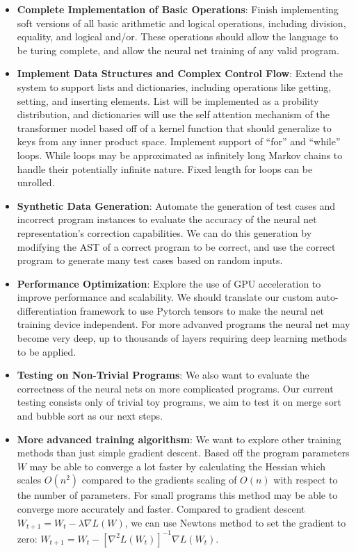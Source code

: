 \documentclass{article}
\begin{document}
\begin{itemize}
    \item \textbf{Complete Implementation of Basic Operations}: Finish implementing soft versions of all basic arithmetic and logical operations, including division, equality, and logical and/or. These operations should allow the language to be turing complete, and allow the neural net training of any valid program.

    \item \textbf{Implement Data Structures and Complex Control Flow}: Extend the system to support lists and dictionaries, including operations like getting, setting, and inserting elements. List will be implemented as a probility distribution, and dictionaries will use the self attention mechanism of the transformer model based off of a kernel function that should generalize to keys from any inner product space. Implement support of ``for'' and ``while'' loops. While loops may be approximated as infinitely long Markov chains to handle their potentially infinite nature. Fixed length for loops can be unrolled.

    \item \textbf{Synthetic Data Generation}: Automate the generation of test cases and incorrect program instances to evaluate the accuracy of the neural net representation's correction capabilities. We can do this generation by modifying the AST of a correct program to be correct, and use the correct program to generate many test cases based on random inputs.

    \item \textbf{Performance Optimization}: Explore the use of GPU acceleration to improve performance and scalability. We should translate our custom auto-differentiation framework to use Pytorch tensors to make the neural net training device independent. For more advanved programs the neural net may become very deep, up to thousands of layers requiring deep learning methods to be applied.

    \item \textbf{Testing on Non-Trivial Programs}: We also want to evaluate the correctness of the neural nets on more complicated programs. Our current testing consists only of trivial toy programs, we aim to test it on merge sort and bubble sort as our next steps.

    \item \textbf{More advanced training algorithsm}: We want to explore other training methods than just simple gradient descent. Based off the program parameters $W$ may be able to converge a lot faster by calculating the Hessian which scales $O(n^2)$ compared to the gradients scaling of $O(n)$ with respect to the number of parameters. For small programs this method may be able to converge more accurately and faster. Compared to gradient descent $W_{t+1} = W_t - \lambda \nabla L(W)$, we can use Newtons method to set the gradient to zero: $W_{t+1} = W_t - [\nabla^2 L(W_t)]^{-1}\nabla L(W_t)$.
\end{itemize}
\end{document}
